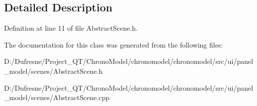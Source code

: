 \subsection{Detailed Description}


Definition at line 11 of file Abstract\-Scene.\-h.



The documentation for this class was generated from the following files\-:\begin{DoxyCompactItemize}
\item 
D\-:/\-Dufresne/\-Project\-\_\-\-Q\-T/\-Chrono\-Model/chronomodel/chronomodel/src/ui/panel\-\_\-model/scenes/Abstract\-Scene.\-h\item 
D\-:/\-Dufresne/\-Project\-\_\-\-Q\-T/\-Chrono\-Model/chronomodel/chronomodel/src/ui/panel\-\_\-model/scenes/Abstract\-Scene.\-cpp\end{DoxyCompactItemize}
